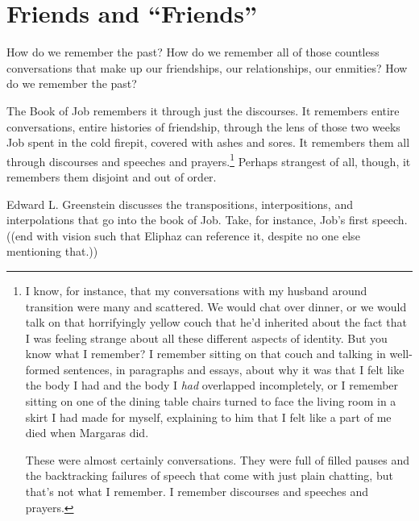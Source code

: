\section*{Friends and “Friends”}

How do we remember the past? How do we remember all of those countless conversations that make up our friendships, our relationships, our enmities? How do we remember the past?

The Book of Job remembers it through just the discourses. It remembers entire conversations, entire histories of friendship, through the lens of those two weeks Job spent in the cold firepit, covered with ashes and sores. It remembers them all through discourses and speeches and prayers.\footnote{I know, for instance, that my conversations with my husband around transition were many and scattered. We would chat over dinner, or we would talk on that horrifyingly yellow couch that he'd inherited about the fact that I was feeling strange about all these different aspects of identity. But you know what I remember? I remember sitting on that couch and talking in well-formed sentences, in paragraphs and essays, about why it was that I felt like the body I had and the body I \emph{had} overlapped incompletely, or I remember sitting on one of the dining table chairs turned to face the living room in a skirt I had made for myself, explaining to him that I felt like a part of me died when Margaras did.

These were almost certainly conversations. They were full of filled pauses and the backtracking failures of speech that come with just plain chatting, but that's not what I remember. I remember discourses and speeches and prayers.} Perhaps strangest of all, though, it remembers them disjoint and out of order.

Edward L. Greenstein discusses the transpositions, interpositions, and interpolations that go into the book of Job. Take, for instance, Job's first speech. ((end with vision such that Eliphaz can reference it, despite no one else mentioning that.))
